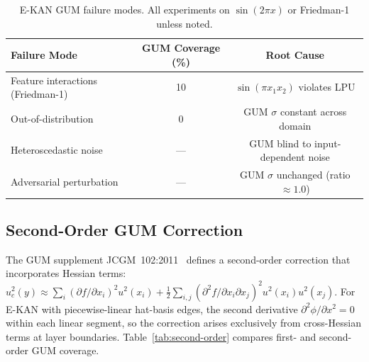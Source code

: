 \documentclass{article}
\begin{document}
\begin{table}[t]
\centering
\caption{E-KAN GUM failure modes.  All experiments on $\sin(2\pi x)$ or
Friedman-1 unless noted.}
\label{tab:failures}
\begin{tabular}{@{}lcc@{}}
\toprule
\textbf{Failure Mode} & \textbf{GUM Coverage (\%)} & \textbf{Root Cause} \\
\midrule
Feature interactions (Friedman-1) & 10 & $\sin(\pi x_1 x_2)$ violates LPU \\
Out-of-distribution             & 0  & GUM $\sigma$ constant across domain \\
Heteroscedastic noise           & ---  & GUM blind to input-dependent noise \\
Adversarial perturbation        & ---  & GUM $\sigma$ unchanged (ratio $\approx 1.0$) \\
\bottomrule
\end{tabular}
\end{table}


\subsection{Second-Order GUM Correction}
\label{sec:second-order}

The GUM supplement JCGM~102:2011~\citep{gum2011supplement} defines a
second-order correction that incorporates Hessian terms:
$u_c^2(y) \approx \sum_i (\partial f/\partial x_i)^2 u^2(x_i)
+ \frac{1}{2}\sum_{i,j} (\partial^2 f / \partial x_i \partial x_j)^2
u^2(x_i) u^2(x_j)$.
For E-KAN with piecewise-linear hat-basis edges, the second derivative
$\partial^2 \phi / \partial x^2 = 0$ within each linear segment, so the
correction arises exclusively from cross-Hessian terms at layer boundaries.
Table~\ref{tab:second-order} compares first- and second-order GUM coverage.
\end{document}
